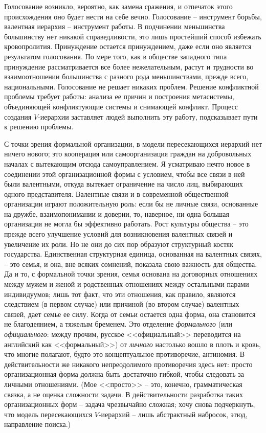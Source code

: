 \documentclass{book}
\begin{document}
Голосование возникло, вероятно, как замена сражения, и от­печаток этого происхождения оно будет нести на себе вечно. Голосование -- инструмент борьбы, валентная иерархия -- инст­румент работы. В подчинении меньшинства большинству нет ни­какой справедливости, это лишь простейший способ избежать кровопролития. Принуждение остается принуждением, даже ес­ли оно является результатом голосования. По мере того, как в обществе западного типа принуждение рассматривается все более нежелательным, растут и трудности во взаимоотношении большинства с разного рода меньшинствами, прежде всего, национальными. Голосование не решает никаких проблем. Решение конфликтной проблемы требует работы: анализа ее причин и по­строения метасистемы, объединяющей конфликтующие системы и снимающей конфликт. Процесс создания $V$-иерархии заставля­ет людей выполнить эту работу, подсказывает пути к решению проблемы.

С точки зрения формальной организации, в модели пересека­ющихся иерархий нет ничего нового; это кооперация или самоор­ганизация граждан на добровольных началах с вытекающим от­сюда самоуправлением. Я усматриваю нечто новое в соединении этой организационной формы с условием, чтобы все связи в ней были валентными, откуда вытекает ограничение на число лиц, выбирающих одного представителя. Валентные связи и в совре­менной общественной организации играют положительную роль:
если бы не личные связи, основанные на дружбе, взаимопонима­нии и доверии, то, наверное, ни одна большая организация не мог­ла бы эффективно работать. Рост культуры общества -- это преж­де всего улучшение условий для возникновения валентных свя­зей и увеличение их роли. Но не они до сих пор образуют струк­турный костяк государства. Единственная структурная единица, основанная на валентных связях, -- это семья, и она, вне всяких сомнений, показала свою важность для общества. Да и то, с фор­мальной точки зрения, семья основана на договорных отношениях между мужем и женой и родственных отношениях между осталь­ными парами индивидуумов; лишь тот факт, что эти отношения, как правило, являются следствием (в первом случае) или причи­ной (во втором случае) валентных связей, дает семье ее силу. Когда от семьи остается одна форма, она становится не благодея­нием, а тяжелым бременем. Это отделение \textit{формального}  (или \textit{официального}:  между прочим, русское <<официальный>> перево­дится на английский как <<формальный>>) от \textit{личного}  настолько вошло в плоть и кровь, что многие полагают, будто это концеп­туальное противоречие, антиномия. В действительности же ника­кого непреодолимого противоречия здесь нет: просто организа­ционная форма должна быть достаточно гибкой, чтобы следо­вать за личными отношениями. (Мое <<просто>> -- это, конечно, грамматическая связка, а не оценка сложности задачи. В дейст­вительности разработка таких организационных форм -- задача чрезвычайно сложная; хочу снова подчеркнуть, что модель пересекающихся $V$-иерархий -- лишь абстрактный набросок, этюд, направление поиска.)
\end{document}
